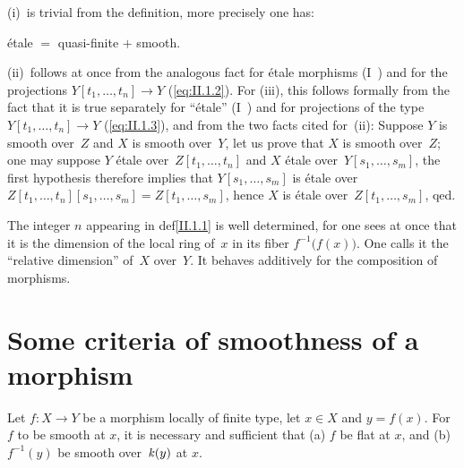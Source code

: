 (i)~is trivial from the definition, more precisely one has:

\begin{corollary}
\label{II.1.4}
\'etale $=$ quasi-finite $+$ smooth.
\end{corollary}

(ii)~follows at once from the analogous fact for
\'etale morphisms (I~) and for the projections $Y[t_1,\dots,t_n]
\to Y$ (\cf \eqref{eq:II.1.2}). For (iii), this follows
formally from the fact that it is true separately for
``\'etale'' (I~) and for projections of the type
$Y[t_1,\dots,t_n]\to Y$
(\cf \eqref{eq:II.1.3}), and from the two facts cited for~(ii):
Suppose $Y$ is smooth over~$Z$ and $X$ is smooth over~$Y$, let us prove that $X$ is
smooth over~$Z$; one may suppose $Y$ \'etale over~$Z[t_1,\dots,t_n]$
and $X$ \'etale over~$Y[s_1,\dots,s_m]$, the first
hypothesis therefore implies that $Y[s_1,\dots,s_m]$ is \'etale over~$Z[t_1,\dots,t_n][s_1,\dots,s_m] = Z[t_1,\dots,s_m]$, hence $X$ is
\'etale over~$Z[t_1,\dots,s_m]$, qed.

\begin{remark}
\label{II.1.5}
The integer $n$ appearing in def\ptbl \ref{II.1.1} is well
determined, for one sees
at once that it is the dimension of the local ring of~$x$ in its
fiber $f^{-1}\big(f(x)\big)$. One calls it the ``relative dimension''
of~$X$ over~$Y$. It behaves additively for the composition of
morphisms.
\end{remark}

\section{Some criteria of smoothness of a morphism}
\label{II.2}

\begin{theorem}
\label{II.2.1}
Let $f\colon X\to Y$ be a morphism locally of finite type, let $x\in
X$ and $y=f(x)$. For $f$ to be smooth at $x$, it is necessary and sufficient
that \textup{(a)} $f$ be flat at $x$, and \textup{(b)} $f^{-1}(y)$ be smooth over~$\mathit{k}(y)$
at $x$.
\end{theorem}

